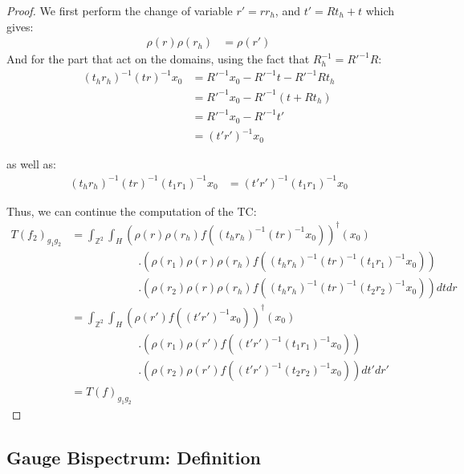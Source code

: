 \documentclass{article}
\begin{document}
\begin{proof}
We first perform the change of variable $r' = rr_h$, and $t'=Rt_h+t$  which gives:
\begin{align*}
    \rho(r)\rho(r_h) &= \rho(r')
\end{align*}
And for the part that act on the domains, using the fact that $R_h^{-1} = R'^{-1}R$:
\begin{align*}
      (t_hr_h)^{-1}(tr)^{-1}x_0
      &= R'^{-1}x_0 - R'^{-1}t-R'^{-1}Rt_h \\
      &= R'^{-1}x_0 - R'^{-1}(t+Rt_h) \\
      &= R'^{-1}x_0 - R'^{-1}t' \\
      &= (t'r')^{-1}x_0
\end{align*}

  as well as:
  \begin{align*}
       (t_hr_h)^{-1}(tr)^{-1}(t_1r_1)^{-1} x_0 &=(t'r')^{-1}(t_1r_1)^{-1} x_0
  \end{align*}

Thus, we can continue the computation of the TC:
\begin{align*}
    T(f_2)_{g_1g_2}
        &= \int_{\mathbb{Z}^2} \int_H
            \left(\rho(r)\rho(r_h)
            f((t_hr_h)^{-1}(tr)^{-1}x_0)\right)^\dagger(x_0) \\
                &\qquad\qquad\qquad.\left(
                \rho(r_1)\rho(r)\rho(r_h)
                f((t_hr_h)^{-1}(tr)^{-1}(t_1r_1)^{-1}x_0)\right)\\
                &\qquad\qquad\qquad.\left(
                \rho(r_2)\rho(r)\rho(r_h)
                f((t_hr_h)^{-1}(tr)^{-1}(t_2r_2)^{-1}x_0)\right) dtdr\\
         &= \int_{\mathbb{Z}^2} \int_H
         \left(\rho(r')
            f((t'r')^{-1}x_0)\right)^\dagger(x_0) \\
                &\qquad\qquad\qquad.\left(
                \rho(r_1)\rho(r')
                f((t'r')^{-1}(t_1r_1)^{-1}x_0)\right)\\
                &\qquad\qquad\qquad.\left(
                \rho(r_2)\rho(r')
                f((t'r')^{-1}(t_2r_2)^{-1}x_0)\right) dt'dr'\\
        &=T(f)_{g_1g_2}
\end{align*}
\end{proof}

\subsection{Gauge Bispectrum: Definition}
\end{document}
